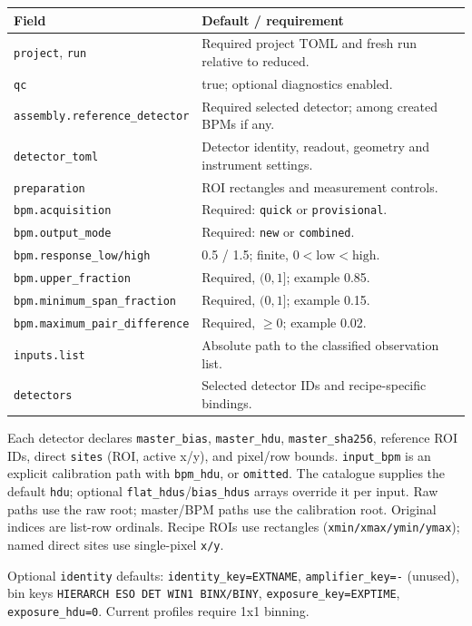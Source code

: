 \documentclass[10pt,a4paper]{article}
\begin{document}
\begin{tabular}{p{.40\linewidth}p{.53\linewidth}}
\textbf{Field} & \textbf{Default / requirement}\\\hline
\texttt{project}, \texttt{run} & Required project TOML and fresh run relative to reduced.\\
\texttt{qc} & true; optional diagnostics enabled.\\
\texttt{assembly.reference\_detector} & Required selected detector; among created BPMs if any.\\
\texttt{detector\_toml} & Detector identity, readout, geometry and instrument settings.\\
\texttt{preparation} & ROI rectangles and measurement controls.\\
\texttt{bpm.acquisition} & Required: \texttt{quick} or \texttt{provisional}.\\
\texttt{bpm.output\_mode} & Required: \texttt{new} or \texttt{combined}.\\
\texttt{bpm.response\_low/high} & 0.5 / 1.5; finite, $0<\mathrm{low}<\mathrm{high}$.\\
\texttt{bpm.upper\_fraction} & Required, $(0,1]$; example 0.85.\\
\texttt{bpm.minimum\_span\_fraction} & Required, $(0,1]$; example 0.15.\\
\texttt{bpm.maximum\_pair\_difference} & Required, $\geq0$; example 0.02.\\
\texttt{inputs.list} & Absolute path to the classified observation list.\\
\texttt{detectors} & Selected detector IDs and recipe-specific bindings.\\
\end{tabular}

Each detector declares \texttt{master\_bias}, \texttt{master\_hdu},
\texttt{master\_sha256}, reference ROI IDs, direct
\texttt{sites} (ROI, active x/y), and pixel/row bounds. \texttt{input\_bpm} is
an explicit calibration path with \texttt{bpm\_hdu}, or \texttt{omitted}.
The catalogue supplies the default \texttt{hdu}; optional
\texttt{flat\_hdus}/\texttt{bias\_hdus} arrays override it per input. Raw paths
use the raw root; master/BPM paths use the calibration root. Original indices
are list-row ordinals. Recipe ROIs use rectangles (\texttt{xmin/xmax/ymin/ymax});
named direct sites use single-pixel \texttt{x/y}.

Optional \texttt{identity} defaults: \texttt{identity\_key=EXTNAME},
\texttt{amplifier\_key=-} (unused), bin keys
\texttt{HIERARCH ESO DET WIN1 BINX/BINY}, \texttt{exposure\_key=EXPTIME},
\texttt{exposure\_hdu=0}. Current profiles require 1x1 binning.
\end{document}
